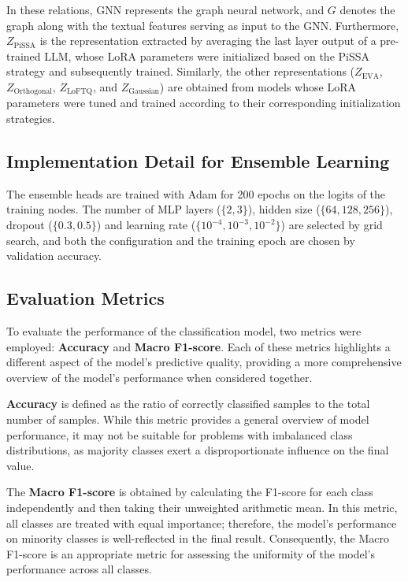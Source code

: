 \documentclass[a4paper,fleqn]{cas-sc}
\DeclareRobustCommand{\revcommon}[2][]{\textcolor{revshared}{#2}} %
\begin{document}
In these relations, $\mathrm{GNN}$ represents the graph neural network, and $G$ denotes the graph along with the textual features serving as input to the GNN. Furthermore, $Z_{\text{PiSSA}}$ is the representation extracted by averaging the last layer output of a pre-trained LLM, whose LoRA parameters were initialized based on the PiSSA strategy and subsequently trained. Similarly, the other representations ($Z_{\text{EVA}}$, $Z_{\text{Orthogonal}}$, $Z_{\text{LoFTQ}}$, and $Z_{\text{Gaussian}}$) are obtained from models whose LoRA parameters were tuned and trained according to their corresponding initialization strategies.

\subsection{Implementation Detail for Ensemble Learning}
\revcommon[R1,R4]{The ensemble heads are trained with Adam for 200 epochs on the logits of the training nodes. The number of MLP layers ($\{2,3\}$), hidden size ($\{64,128,256\}$), dropout ($\{0.3,0.5\}$) and learning rate ($\{10^{-4},10^{-3},10^{-2}\}$) are selected by grid search, and both the configuration and the training epoch are chosen by validation accuracy.}

\subsection{Evaluation Metrics}
To evaluate the performance of the classification model, two metrics were employed: \textbf{Accuracy} and \textbf{Macro F1-score}. Each of these metrics highlights a different aspect of the model's predictive quality, providing a more comprehensive overview of the model's performance when considered together.

\textbf{Accuracy} is defined as the ratio of correctly classified samples to the total number of samples. While this metric provides a general overview of model performance, it may not be suitable for problems with imbalanced class distributions, as majority classes exert a disproportionate influence on the final value.

The \textbf{Macro F1-score} is obtained by calculating the F1-score for each class independently and then taking their unweighted arithmetic mean. In this metric, all classes are treated with equal importance; therefore, the model's performance on minority classes is well-reflected in the final result. Consequently, the Macro F1-score is an appropriate metric for assessing the uniformity of the model's performance across all classes.
\end{document}
